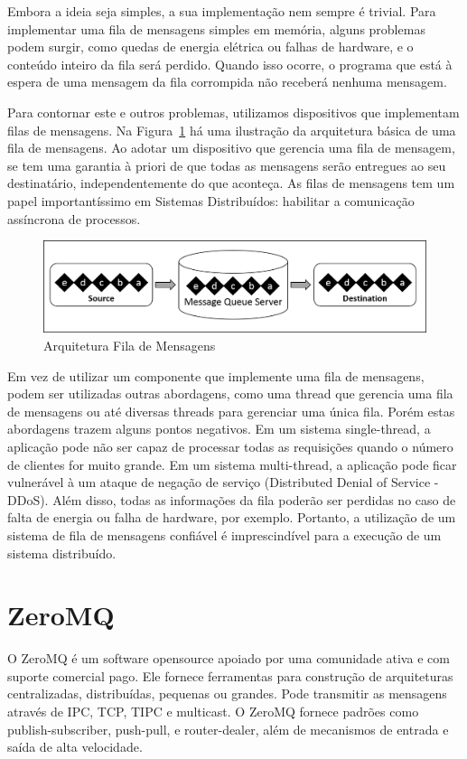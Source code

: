 \documentclass[12pt]{article}
\begin{document}
	Embora a ideia seja simples, a sua implementação nem sempre é trivial. Para implementar uma fila de mensagens simples em memória, alguns problemas podem surgir, como quedas de energia elétrica ou falhas de hardware, e o conteúdo 
inteiro da fila será perdido. Quando isso ocorre, o programa que está à espera de uma mensagem da fila corrompida não receberá nenhuma mensagem.

	Para contornar este e outros problemas, utilizamos dispositivos que implementam filas de mensagens. Na Figura~\ref{fig:fig_msgqueue} há uma ilustração da arquitetura básica de uma fila de mensagens. Ao adotar um dispositivo que gerencia uma fila de mensagem, se tem uma garantia à priori de que todas as mensagens serão entregues ao seu destinatário, independentemente do que aconteça. As filas de mensagens tem um papel importantíssimo em Sistemas Distribuídos: habilitar a comunicação assíncrona de processos.

\begin{figure}[ht]
\centering
	\includegraphics[width=.5\textwidth]{Img_MsgQueue.png}
\caption{Arquitetura Fila de Mensagens}
\label{fig:fig_msgqueue}
\end{figure}

	Em vez de utilizar um componente que implemente uma fila de mensagens, podem ser utilizadas outras abordagens, como uma thread que gerencia uma fila de mensagens ou até diversas threads para gerenciar uma única fila. Porém estas abordagens trazem alguns pontos negativos. Em um sistema single-thread, a aplicação pode não ser capaz de processar todas as requisições quando o número de clientes for muito grande. Em um sistema multi-thread, a aplicação pode ficar vulnerável à um ataque de negação de serviço (Distributed Denial of Service - DDoS). Além disso, todas as informações da fila poderão ser perdidas no caso de falta de energia ou falha de  hardware, por exemplo. Portanto, a utilização de um sistema de fila de mensagens confiável é imprescindível para a execução de um sistema distribuído.

\section{ZeroMQ} \label{sec:firstpage}
	O ZeroMQ é um software opensource apoiado por uma comunidade ativa e com suporte comercial pago. Ele fornece ferramentas para construção de arquiteturas centralizadas, distribuídas, pequenas ou grandes. Pode transmitir as mensagens através de IPC, TCP, TIPC e multicast. O ZeroMQ fornece padrões como publish-subscriber, push-pull, e router-dealer, além de mecanismos de entrada e saída de alta velocidade.
\end{document}
